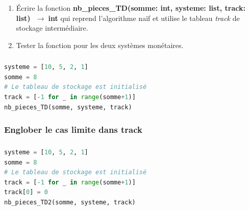 \documentclass[svgnames,11pt]{beamer}
\begin{document}
\begin{frame}
    \frametitle{}

    \begin{activite}
        \begin{enumerate}
            \item Écrire la fonction \textbf{nb\_pieces\_TD(somme: int, systeme: list, track: list) $\;\rightarrow\;$int} qui reprend l'algorithme naïf et utilise le tableau \emph{track} de stockage intermédiaire.
            \item Tester la fonction pour les deux systèmes monétaires.
        \end{enumerate}
        \end{activite}

\end{frame}

\begin{frame}
    \frametitle{}

    

\end{frame}
\begin{frame}[fragile]
    \frametitle{}

    \begin{center}
        \begin{lstlisting}[language=Python]
systeme = [10, 5, 2, 1]
somme = 8
# Le tableau de stockage est initialisé
track = [-1 for _ in range(somme+1)]
nb_pieces_TD(somme, systeme, track)
        \end{lstlisting}
        \label{moncode}
    \end{center}

\end{frame}
\begin{frame}
    \frametitle{Englober le cas limite dans track}

    

\end{frame}

\begin{frame}[fragile]
    \frametitle{}

    \begin{center}
        \begin{lstlisting}[language=Python]
systeme = [10, 5, 2, 1]
somme = 8
# Le tableau de stockage est initialisé
track = [-1 for _ in range(somme+1)]
track[0] = 0
nb_pieces_TD2(somme, systeme, track)
        \end{lstlisting}
        \label{moncode}
    \end{center}

\end{frame}
\end{document}
